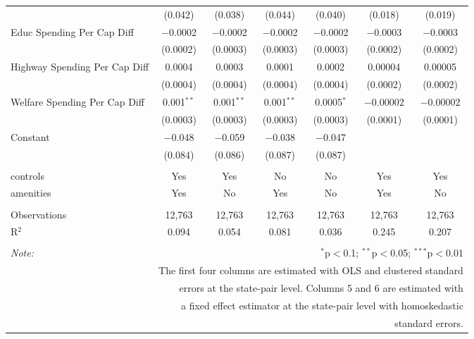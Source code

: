 \begin{table}[!htbp]
\begin{tabular}{@{\extracolsep{5pt}}lcccccc}
  & (0.042) & (0.038) & (0.044) & (0.040) & (0.018) & (0.019) \\ 
  Educ Spending Per Cap Diff & $-$0.0002 & $-$0.0002 & $-$0.0002 & $-$0.0002 & $-$0.0003 & $-$0.0003 \\ 
  & (0.0002) & (0.0003) & (0.0003) & (0.0003) & (0.0002) & (0.0002) \\ 
  Highway Spending Per Cap Diff & 0.0004 & 0.0003 & 0.0001 & 0.0002 & 0.00004 & 0.00005 \\ 
  & (0.0004) & (0.0004) & (0.0004) & (0.0004) & (0.0002) & (0.0002) \\ 
  Welfare Spending Per Cap Diff & 0.001$^{**}$ & 0.001$^{**}$ & 0.001$^{**}$ & 0.0005$^{*}$ & $-$0.00002 & $-$0.00002 \\ 
  & (0.0003) & (0.0003) & (0.0003) & (0.0003) & (0.0001) & (0.0001) \\ 
  Constant & $-$0.048 & $-$0.059 & $-$0.038 & $-$0.047 &  &  \\ 
  & (0.084) & (0.086) & (0.087) & (0.087) &  &  \\ 
 \hline \\[-1.8ex] 
controls & Yes & Yes & No & No & Yes & Yes \\ 
amenities & Yes & No & Yes & No & Yes & No \\ 
\hline \\[-1.8ex] 
Observations & 12,763 & 12,763 & 12,763 & 12,763 & 12,763 & 12,763 \\ 
R$^{2}$ & 0.094 & 0.054 & 0.081 & 0.036 & 0.245 & 0.207 \\ 
\hline 
\hline \\[-1.8ex] 
\textit{Note:}  & \multicolumn{6}{r}{$^{*}$p$<$0.1; $^{**}$p$<$0.05; $^{***}$p$<$0.01} \\ 
 & \multicolumn{6}{r}{The first four columns are estimated with OLS and clustered standard} \\ 
 & \multicolumn{6}{r}{ errors at the state-pair level. Columns 5 and 6 are estimated with} \\ 
 & \multicolumn{6}{r}{a fixed effect estimator at the state-pair level with homoskedastic} \\ 
 & \multicolumn{6}{r}{standard errors.} \\ 
\end{tabular} 
\end{table} 
